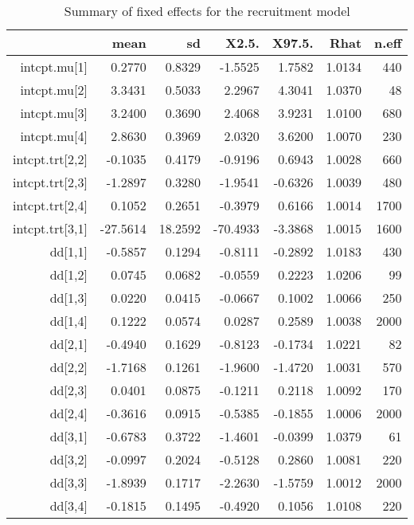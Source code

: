 \begin{table}[ht]
\centering
\caption{Summary of fixed effects for the recruitment model} 
\label{table:recruitment}
\begin{tabular}{rrrrrrr}
  \hline
 & mean & sd & X2.5. & X97.5. & Rhat & n.eff \\ 
  \hline
intcpt.mu[1] & 0.2770 & 0.8329 & -1.5525 & 1.7582 & 1.0134 &   440 \\ 
  intcpt.mu[2] & 3.3431 & 0.5033 & 2.2967 & 4.3041 & 1.0370 &    48 \\ 
  intcpt.mu[3] & 3.2400 & 0.3690 & 2.4068 & 3.9231 & 1.0100 &   680 \\ 
  intcpt.mu[4] & 2.8630 & 0.3969 & 2.0320 & 3.6200 & 1.0070 &   230 \\ 
  intcpt.trt[2,2] & -0.1035 & 0.4179 & -0.9196 & 0.6943 & 1.0028 &   660 \\ 
  intcpt.trt[2,3] & -1.2897 & 0.3280 & -1.9541 & -0.6326 & 1.0039 &   480 \\ 
  intcpt.trt[2,4] & 0.1052 & 0.2651 & -0.3979 & 0.6166 & 1.0014 &  1700 \\ 
  intcpt.trt[3,1] & -27.5614 & 18.2592 & -70.4933 & -3.3868 & 1.0015 &  1600 \\ 
  dd[1,1] & -0.5857 & 0.1294 & -0.8111 & -0.2892 & 1.0183 &   430 \\ 
  dd[1,2] & 0.0745 & 0.0682 & -0.0559 & 0.2223 & 1.0206 &    99 \\ 
  dd[1,3] & 0.0220 & 0.0415 & -0.0667 & 0.1002 & 1.0066 &   250 \\ 
  dd[1,4] & 0.1222 & 0.0574 & 0.0287 & 0.2589 & 1.0038 &  2000 \\ 
  dd[2,1] & -0.4940 & 0.1629 & -0.8123 & -0.1734 & 1.0221 &    82 \\ 
  dd[2,2] & -1.7168 & 0.1261 & -1.9600 & -1.4720 & 1.0031 &   570 \\ 
  dd[2,3] & 0.0401 & 0.0875 & -0.1211 & 0.2118 & 1.0092 &   170 \\ 
  dd[2,4] & -0.3616 & 0.0915 & -0.5385 & -0.1855 & 1.0006 &  2000 \\ 
  dd[3,1] & -0.6783 & 0.3722 & -1.4601 & -0.0399 & 1.0379 &    61 \\ 
  dd[3,2] & -0.0997 & 0.2024 & -0.5128 & 0.2860 & 1.0081 &   220 \\ 
  dd[3,3] & -1.8939 & 0.1717 & -2.2630 & -1.5759 & 1.0012 &  2000 \\ 
  dd[3,4] & -0.1815 & 0.1495 & -0.4920 & 0.1056 & 1.0108 &   220 \\ 

\end{tabular}
\end{table}
